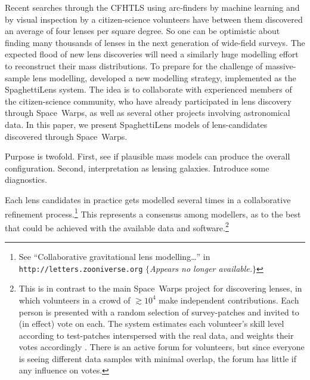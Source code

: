 Recent searches through the CFHTLS \citep{2012SPIE.8448E..0MC} using
arc-finders
\citep{2012ApJ...749...38M,2014A&A...567A.111M,2014ApJ...785..144G} by
machine learning \citep{2016arXiv160504309P} and by visual inspection
by a citizen-science volunteers
\citep[Space~Warps][]{2016MNRAS.455.1191M} have between them
discovered an average of four lenses per square degree.  So one can be
optimistic about finding many thousands of lenses in the next
generation of wide-field surveys.  The expected flood of new lens
discoveries will need a similarly huge modelling effort to reconstruct
their mass distributions.  To prepare for the challenge of
massive-sample lens modelling, \cite{2015MNRAS.447.2170K} developed a
new modelling strategy, implemented as the SpaghettiLens system.  The
idea is to collaborate with experienced members of the citizen-science
community, who have already participated in lens discovery through
Space~Warps, as well as several other projects involving astronomical
data.  In this paper, we present SpaghettiLens models of lens-candidates
discovered through Space~Warps.

Purpose is twofold.  First, see if plausible mass models can produce
the overall configuration.  Second, interpretation as lensing
galaxies.  Introduce some diagnostics.

Each lens candidates in practice gets modelled several times in a
collaborative refinement process.\footnote{ See ``Collaborative
  gravitational lens modelling\dots'' in {\tt
    http://letters.zooniverse.org} $\{${\em Appears no longer
    available.}$\}$} This represents a consensus among modellers, as
to the best that could be achieved with the available data and
software.\footnote{This is in contrast to the main Space~Warps project
  for discovering lenses, in which volunteers in a crowd of
  $\gtrsim10^4$ make independent contributions.  Each person is
  presented with a random selection of survey-patches and invited to
  (in effect) vote on each.  The system estimates each volunteer's
  skill level according to test-patches interspersed with the real
  data, and weights their votes accordingly
  \citep{2016MNRAS.455.1171M}.  There is an active forum for
  volunteers, but since everyone is seeing different data samples with
  minimal overlap, the forum has little if any influence on votes.}

